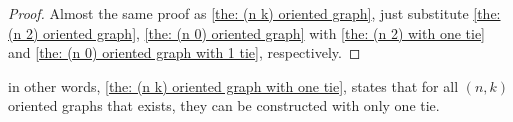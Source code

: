\begin{proof}
  Almost the same proof as \cref{the: (n k) oriented graph},
  just substitute \cref{the: (n 2) oriented graph},
  \cref{the: (n 0) oriented graph} with
  \cref{the: (n 2) with one tie}
  and \cref{the: (n 0) oriented graph with 1 tie},
  respectively.
\end{proof}

in other words,
\cref{the: (n k) oriented graph with one tie},
states that for all \((n, k)\) oriented graphs
that exists, they can be constructed with only one tie.

